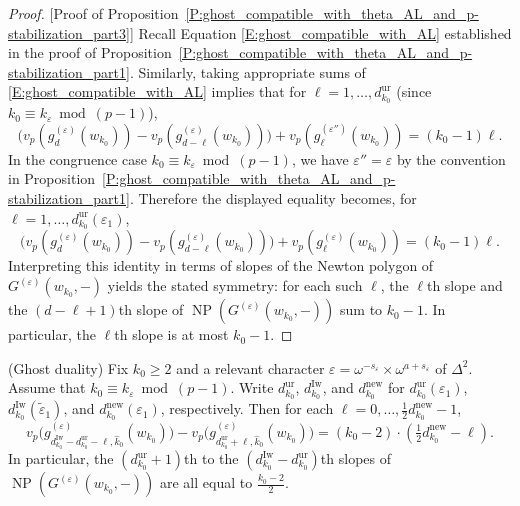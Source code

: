 \begin{proof}
    [Proof of Proposition~\ref{P:ghost_compatible_with_theta_AL_and_p-stabilization_part3}]
    Recall Equation \eqref{E:ghost_compatible_with_AL} established in the proof of Proposition~\ref{P:ghost_compatible_with_theta_AL_and_p-stabilization_part1}.
    Similarly, taking appropriate sums of \eqref{E:ghost_compatible_with_AL} implies that for $\ell = 1, \dots, d_{k_0}^{\mathrm{ur}}$ (since ${k_0} \equiv k_\varepsilon \bmod{(p-1)}$),
    $$
    \big(v_p(g^{(\varepsilon)}_d(w_{k_0})) - v_p(g^{(\varepsilon)}_{d-\ell}(w_{k_0})) \big) + v_p(g_\ell^{(\varepsilon'')}(w_{k_0})) = (k_0-1) \ell.
    $$
    In the congruence case ${k_0}\equiv k_\varepsilon \bmod{(p-1)}$, we have $\varepsilon''=\varepsilon$ by the convention in Proposition~\ref{P:ghost_compatible_with_theta_AL_and_p-stabilization_part1}. Therefore the displayed equality becomes, for $\ell=1,\dots,d_{k_0}^{\mathrm{ur}}(\varepsilon_1)$,
    $$
    \big(v_p(g^{(\varepsilon)}_d(w_{k_0})) - v_p(g^{(\varepsilon)}_{d-\ell}(w_{k_0})) \big) + v_p(g_\ell^{(\varepsilon)}(w_{k_0})) = (k_0-1) \ell.
    $$
    Interpreting this identity in terms of slopes of the Newton polygon of $G^{(\varepsilon)}(w_{k_0},-)$ yields the stated symmetry: for each such $\ell$, the $\ell$th slope and the $(d-\ell+1)$th slope of ${\operatorname{NP}}(G^{(\varepsilon)}(w_{k_0}, -))$ sum to ${k_0}-1$. In particular, the $\ell$th slope is at most ${k_0}-1$.
\end{proof}

\begin{proposition}
    \label{P:ghost_compatible_with_theta_AL_and_p-stabilization_part4}
    (Ghost duality)
    Fix $k_0 \geq 2$ and a relevant character $\varepsilon= \omega^{-s_\varepsilon} \times \omega^{a+s_\varepsilon}$ of $\Delta^2$. Assume that ${k_0} \equiv k_\varepsilon \bmod{(p-1)}$. Write $d_{k_0}^{\mathrm{ur}}$, $d_{k_0}^{\mathrm{Iw}}$, and $d_{k_0}^{{\mathrm{new}}}$ for $d_{k_0}^{\mathrm{ur}}(\varepsilon_1)$, $d_{k_0}^{\mathrm{Iw}}(\tilde \varepsilon_1)$, and $d_{k_0}^{{\mathrm{new}}}(\varepsilon_1)$, respectively.
    Then for each $\ell = 0, \dots,\frac 12 d_{k_0}^{{\mathrm{new}}}-1$,
    \begin{equation}
    \label{E:ghost_duality}
    v_p\big(g_{d_{k_0}^{\mathrm{Iw}}- d_{k_0}^{\mathrm{ur}}-\ell, \hat k_0}^{(\varepsilon)} (w_{k_0}) \big) - v_p\big(g_{ d_{k_0}^{\mathrm{ur}}+\ell, \hat k_0}^{(\varepsilon)} (w_{k_0}) \big) = ({k_0}-2) \cdot (\tfrac 12d_{k_0}^{{\mathrm{new}}} - \ell).
    \end{equation}
    In particular, the $(d_{k_0}^{\mathrm{ur}}+1)$th to the $(d_{k_0}^{\mathrm{Iw}}-d_{k_0}^{\mathrm{ur}})$th slopes of ${\operatorname{NP}}(G^{(\varepsilon)}(w_{k_0},-))$ are all equal to $\frac{{k_0}-2}2$.
\end{proposition}

